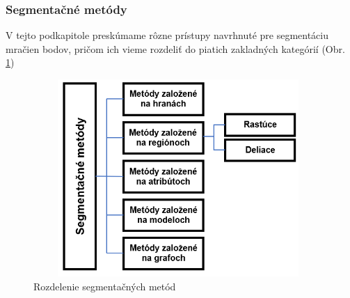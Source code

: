 \subsubsection{Segmentačné metódy}
\noindent V tejto podkapitole preskúmame rôzne prístupy navrhnuté pre segmentáciu mračien bodov, pričom ich vieme rozdeliť do piatich zakladných kategórií (Obr. \ref{segmentation_methods})
\begin{figure}[!htbp]
  \centering
  \includegraphics[width=11cm,height=7.5cm]{img/segmentation_methods.png}
  \caption{Rozdelenie segmentačných metód}
  \label{segmentation_methods}
\end{figure}
